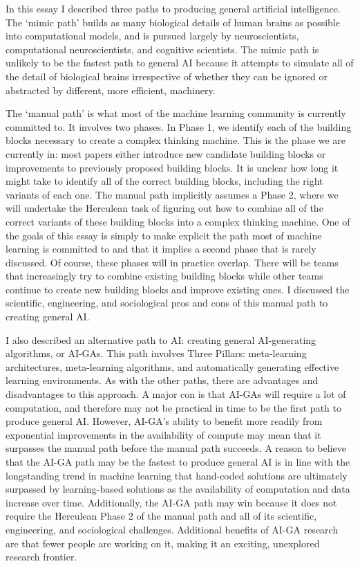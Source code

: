\documentclass{article}
\begin{document}
In this essay I described three paths to producing general artificial intelligence. The `mimic path' builds as many biological details of human brains as possible into computational models, and is pursued largely by neuroscientists, computational neuroscientists, and cognitive scientists. The mimic path is unlikely to be the fastest path to general AI because it attempts to simulate all of the detail of biological brains irrespective of whether they can be ignored or abstracted by different, more efficient, machinery.  

The `manual path' is what most of the machine learning community is currently committed to. It involves two phases. In Phase 1, we identify each of the building blocks necessary to create a complex thinking machine. This is the phase we are currently in: most papers either introduce new candidate building blocks or improvements to previously proposed building blocks. It is unclear how long it might take to identify all of the correct building blocks, including the right variants of each one. The manual path implicitly assumes a Phase 2, where we will undertake the Herculean task of figuring out how to combine all of the correct variants of these building blocks into a complex thinking machine. One of the goals of this essay is simply to make explicit the path most of machine learning is committed to and that it implies a second phase that is rarely discussed. Of course, these phases will in practice overlap. There will be teams that increasingly try to combine existing building blocks while other teams continue to create new building blocks and improve existing ones. I discussed the scientific, engineering, and sociological pros and cons of this manual path to creating general AI. 

I also described an alternative path to AI: creating general AI-generating algorithms, or AI-GAs. This path involves Three Pillars: meta-learning architectures, meta-learning algorithms, and automatically generating effective learning environments. As with the other paths, there are advantages and disadvantages to this approach. A major con is that AI-GAs will require a lot of computation, and therefore may not be practical in time to be the first path to produce general AI. However, AI-GA's ability to benefit more readily from exponential improvements in the availability of compute may mean that it surpasses the manual path before the manual path succeeds. A reason to believe that the AI-GA path may be the fastest to produce general AI is in line with the longstanding trend in machine learning that hand-coded solutions are ultimately surpassed by learning-based solutions as the availability of computation and data increase over time. Additionally, the AI-GA path may win because it does not require the Herculean Phase 2 of the manual path and all of its scientific, engineering, and sociological challenges. Additional benefits of AI-GA research are that fewer people are working on it, making it an exciting, unexplored research frontier. 
\end{document}
